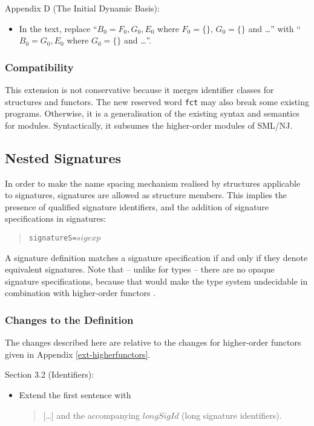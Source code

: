 \documentclass[twoside,titlepage]{article}
\begin{document}
\begin{appendix}
Appendix D (The Initial Dynamic Basis):
\begin{itemize}
\item In the text, replace ``$B_0 = F_0,G_0,E_0$ where $F_0=\{\}$, $G_0=\{\}$ and \dots'' with ``$B_0 = G_0,E_0$ where $G_0=\{\}$ and \dots''.
\end{itemize}

\subsubsection*{Compatibility}

This extension is not conservative because it merges identifier classes for structures and functors. The new reserved word {\tt fct} may also break some existing programs. Otherwise, it is a generalisation of the existing syntax and semantics for modules. Syntactically, it subsumes the higher-order modules of SML/NJ.


\subsection{Nested Signatures}
\label{ext-nestedsignatures}

In order to make the name spacing mechanism realised by structures applicable to signatures, signatures are allowed as structure members. This implies the presence of qualified signature identifiers, and the addition of signature specifications in signatures:
\begin{quote}
\begin{alltt}
signature S = \(\mathit{sigexp}\)
\end{alltt}
\end{quote}
A signature definition matches a signature specification if and only if they denote equivalent signatures.
Note that -- unlike for types -- there are no opaque signature specifications, because that would make the type system undecidable in combination with higher-order functors \cite{translucent}.

\subsubsection*{Changes to the Definition}

The changes described here are relative to the changes for higher-order functors given in Appendix \ref{ext-higherfunctors}.

Section 3.2 (Identifiers):
\begin{itemize}
\item Extend the first sentence with
  \begin{quote}
  [\dots] and the accompanying $\mathit{longSigId}$ (long signature identifiers).
  \end{quote}
\end{itemize}


\end{appendix}
\end{document}
